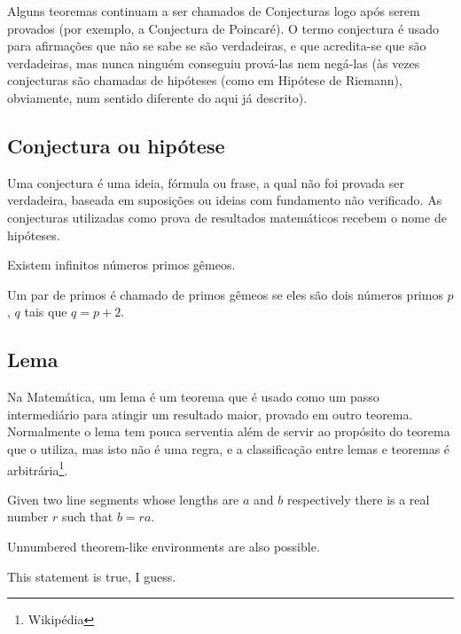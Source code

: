 \documentclass[
	article,			%
	12pt,				%
	twoside,			%
	a4paper,			%
	english,			%
	brazil,				%
	sumario=tradicional
	]{abntex2-modelo-notas-de-aula}
\begin{document}
Alguns teoremas continuam a ser chamados de Conjecturas logo após serem provados (por exemplo, a Conjectura de Poincaré). O termo conjectura é usado para afirmações que não se sabe se são verdadeiras, e que acredita-se que são verdadeiras, mas nunca ninguém conseguiu prová-las nem negá-las (às vezes conjecturas são chamadas de hipóteses (como em Hipótese de Riemann), obviamente, num sentido diferente do aqui já descrito).


\subsection{Conjectura ou hipótese}

Uma conjectura é uma ideia, fórmula ou frase, a qual não foi provada ser verdadeira, baseada em suposições ou ideias com fundamento não verificado. As conjecturas utilizadas como prova de resultados matemáticos recebem o nome de hipóteses.



\begin{conjectura}	
	Existem infinitos números primos gêmeos.
\end{conjectura}

Um par de primos é chamado de primos gêmeos se eles são dois números primos $p$, $q$ tais que $q = p + 2$.



\subsection{Lema}

Na Matemática, um lema é um teorema que é usado como um passo intermediário para atingir um resultado maior, provado em outro teorema. Normalmente o lema tem pouca serventia além de servir ao propósito do teorema que o utiliza, mas isto não é uma regra, e a classificação entre lemas e teoremas é arbitrária\footnote{Wikipédia}.


\begin{lema}	
	Given two line segments whose lengths are $a$ and $b$ respectively there is a 
	real number $r$ such that $b=ra$.
\end{lema}



Unnumbered theorem-like environments are also possible.

\begin{observacao}
	This statement is true, I guess.
\end{observacao}
\end{document}
